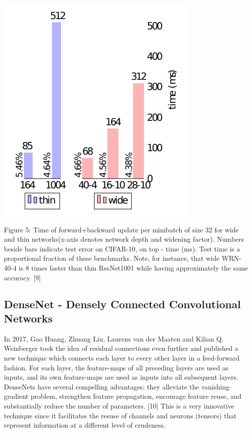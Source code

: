 \documentclass[conference]{IEEEtran}
\begin{document}
\begin{center}
    \includegraphics[scale=0.4]{WRN.PNG}\\
\end{center}
Figure 5: Time of forward+backward update per minibatch of size 32 for wide and thin networks(x-axis denotes network depth and widening factor). Numbers beside bars indicate test error on CIFAR-10, on top - time (ms). Test time is a proportional fraction of these benchmarks. Note, for instance, that wide WRN-40-4 is 8 times faster than thin ResNet1001 while having approximately the same accuracy. [9]

\subsection{\textbf{DenseNet - Densely Connected Convolutional Networks}}
In 2017, Gao Huang, Zhuang Liu, Laurens van der Maaten and Kilian Q. Weinberger took the idea of residual connections even further and published a new technique which connects each layer to every other layer in a feed-forward fashion. For each layer, the feature-maps of all preceding layers are used as inputs, and its own feature-maps are used as inputs into all subsequent layers. DenseNets have several compelling advantages: they alleviate the vanishing-gradient problem, strengthen feature propagation, encourage feature reuse, and substantially reduce the number of parameters. [10] This is a very innovative technique since it facilitates the resuse of channels and neurons (tensors) that represent information at a different level of crudeness.
\end{document}

